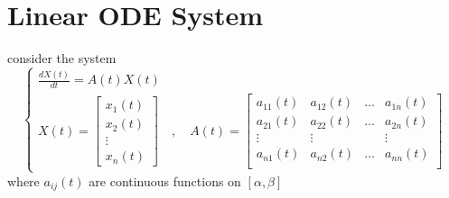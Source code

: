\documentclass[]{article}
\begin{document}
\section{Linear ODE System}
consider the system
\begin{equation}
    \begin{cases}
        \displaystyle \frac{dX(t)}{dt} = A(t)X(t)
        \\
        \displaystyle X(t) = \begin{bmatrix}
                                 x_{1}(t) \\
                                 x_{2}(t) \\
                                 \vdots   \\
                                 x_{n}(t)
                             \end{bmatrix}
        \quad , \quad
        A(t) = \begin{bmatrix}
                   a_{11}(t) & a_{12}(t) & \dots & a_{1n}(t) \\
                   a_{21}(t) & a_{22}(t) & \dots & a_{2n}(t) \\
                   \vdots    & \vdots    &       & \vdots    \\
                   a_{n1}(t) & a_{n2}(t) & \dots & a_{nn}(t) \\
               \end{bmatrix}
    \end{cases}
\end{equation}
where $a_{ij}(t)$ are continuous functions on $[\alpha , \beta]$
\end{document}
